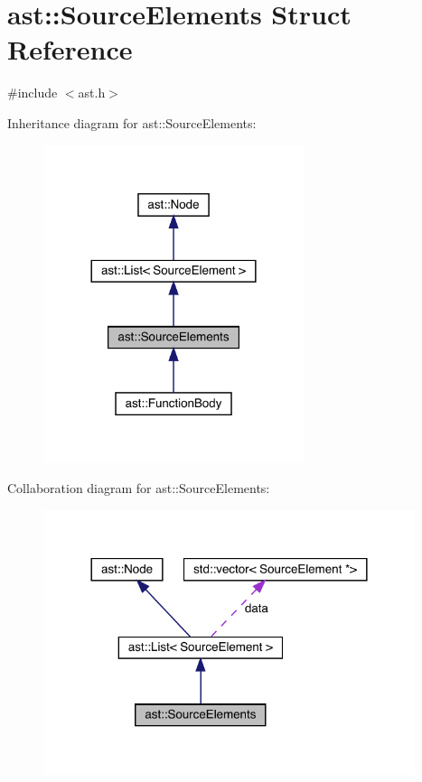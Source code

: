 \hypertarget{structast_1_1_source_elements}{}\section{ast\+:\+:Source\+Elements Struct Reference}
\label{structast_1_1_source_elements}


{\ttfamily \#include $<$ast.\+h$>$}



Inheritance diagram for ast\+:\+:Source\+Elements\+:\nopagebreak
\begin{figure}[H]
\begin{center}
\leavevmode
\includegraphics[width=216pt]{structast_1_1_source_elements__inherit__graph}
\end{center}
\end{figure}


Collaboration diagram for ast\+:\+:Source\+Elements\+:\nopagebreak
\begin{figure}[H]
\begin{center}
\leavevmode
\includegraphics[width=308pt]{structast_1_1_source_elements__coll__graph}
\end{center}
\end{figure}
